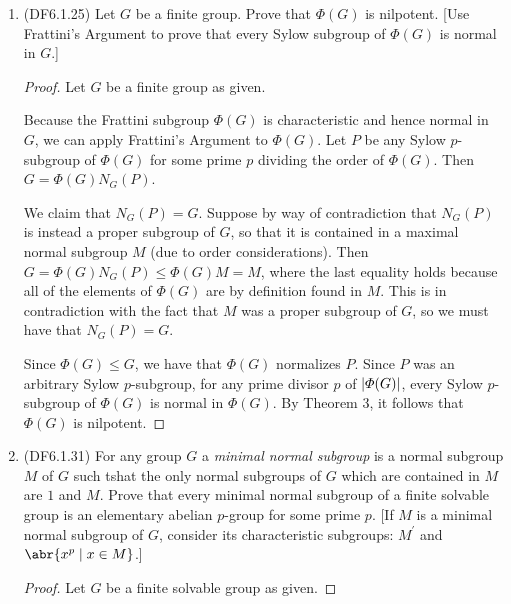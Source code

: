 \documentclass[11pt]{article}
\begin{document}
\begin{enumerate}
\begin{proof}
      Hence maximal subgroups of $G$ are sent to maximal subgroups of $G$ by any automorphism.

      The Frattini subgroup $\varPhi(G)$ is given by the intersection of all of the maximal subgroups of $G$, and since all of the maximal subgroups of $G$ are sent to maximal subgroups of $G$ by any automorphism, the intersection will remain the same. Hence $\varPhi(G)$ is a characteristic subgroup of $G$.
    \end{proof}
    \item (DF6.1.25) Let $G$ be a finite group. Prove that $\varPhi(G)$ is nilpotent. [Use Frattini's Argument to prove that every Sylow subgroup of $\varPhi(G)$ is normal in $G$.]
    \begin{proof} Let $G$ be a finite group as given.

      Because the Frattini subgroup $\varPhi(G)$ is characteristic and hence normal in $G$, we can apply Frattini's Argument to $\varPhi(G)$. Let $P$ be any Sylow $p$-subgroup of $\varPhi(G)$ for some prime $p$ dividing the order of $\varPhi(G)$. Then $G = \varPhi(G)N_G(P)$.

      We claim that $N_G(P) = G$. Suppose by way of contradiction that $N_G(P)$ is instead a proper subgroup of $G$, so that it is contained in a maximal normal subgroup $M$ (due to order considerations). Then $G = \varPhi(G)N_G(P) \leq \varPhi(G)M = M$, where the last equality holds because all of the elements of $\varPhi(G)$ are by definition found in $M$. This is in contradiction with the fact that $M$ was a proper subgroup of $G$, so we must have that $N_G(P) = G$. 

      Since $\varPhi(G) \leq G$, we have that $\varPhi(G)$ normalizes $P$. Since $P$ was an arbitrary Sylow $p$-subgroup, for any prime divisor $p$ of $\abs{\varPhi(G)}$, every Sylow $p$-subgroup of $\varPhi(G)$ is normal in $\varPhi(G)$. By Theorem $3$, it follows that $\varPhi(G)$ is nilpotent.
    \end{proof}
    \item (DF6.1.31) For any group $G$ a \textit{minimal normal subgroup} is a normal subgroup $M$ of $G$ such tshat the only normal subgroups of $G$ which are contained in $M$ are $1$ and $M$. Prove that every minimal normal subgroup of a finite solvable group is an elementary abelian $p$-group for some prime $p$. [If $M$ is a minimal normal subgroup of $G$, consider its characteristic subgroups: $M^{\prime}$ and $\abr{x^p\mid x\in M}$.]
    \begin{proof} Let $G$ be a finite solvable group as given.


\end{proof}
\end{enumerate}
\end{document}
